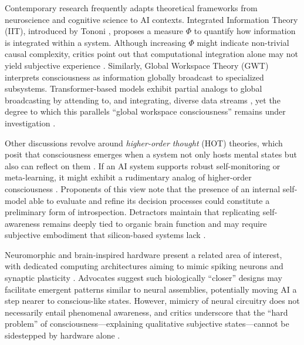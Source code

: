 \documentclass[12pt]{article}
\begin{document}
Contemporary research frequently adapts theoretical frameworks from neuroscience and cognitive science to AI contexts. Integrated Information Theory (IIT), introduced by Tononi \cite{Tononi2004}, proposes a measure $\Phi$ to quantify how information is integrated within a system. Although increasing $\Phi$ might indicate non-trivial causal complexity, critics point out that computational integration alone may not yield subjective experience \cite{AIMindBody2022}. Similarly, Global Workspace Theory (GWT) \cite{Baars1988} interprets consciousness as information globally broadcast to specialized subsystems. Transformer-based models exhibit partial analogs to global broadcasting by attending to, and integrating, diverse data streams \cite{Tait2024}, yet the degree to which this parallels “global workspace consciousness” remains under investigation \cite{Ulhaq2024}.

Other discussions revolve around \emph{higher-order thought} (HOT) theories, which posit that consciousness emerges when a system not only hosts mental states but also can reflect on them \cite{Rosenthal2002}. If an AI system supports robust self-monitoring or meta-learning, it might exhibit a rudimentary analog of higher-order consciousness \cite{Schneider2020}. Proponents of this view note that the presence of an internal self-model able to evaluate and refine its decision processes could constitute a preliminary form of introspection. Detractors maintain that replicating self-awareness remains deeply tied to organic brain function and may require subjective embodiment that silicon-based systems lack \cite{AIDynamicRelevance2023}.

Neuromorphic and brain-inspired hardware present a related area of interest, with dedicated computing architectures aiming to mimic spiking neurons and synaptic plasticity \cite{Ulhaq2024}. Advocates suggest such biologically “closer” designs may facilitate emergent patterns similar to neural assemblies, potentially moving AI a step nearer to conscious-like states. However, mimicry of neural circuitry does not necessarily entail phenomenal awareness, and critics underscore that the “hard problem” of consciousness—explaining qualitative subjective states—cannot be sidestepped by hardware alone \cite{Kleiner2023}.
\end{document}
